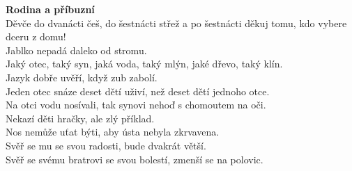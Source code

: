 \begin{multicols}{\value{columnsgames}}
\noindent
{\large\bf Rodina a příbuzní}\\[1 mm]
Děvče do dvanácti češ, do šestnácti střež a po šestnácti 
děkuj tomu, kdo vybere dceru z domu!\\
Jablko nepadá daleko od stromu.\\
Jaký otec, taký syn, jaká voda, taký mlýn, jaké dřevo, taký klín.\\
Jazyk dobře uvěří, když zub zabolí.\\
Jeden otec snáze deset dětí uživí, než deset dětí jednoho otce.\\
Na otci vodu nosívali, tak synovi nehoď s chomoutem na oči.\\
Nekazí děti hračky, ale zlý příklad.\\
Nos nemůže uťat býti, aby ústa nebyla zkrvavena.\\
Svěř se mu se svou radosti, bude dvakrát větší.\\
Svěř se svému bratrovi se svou bolestí, zmenší se na polovic.\\


\end{multicols}
